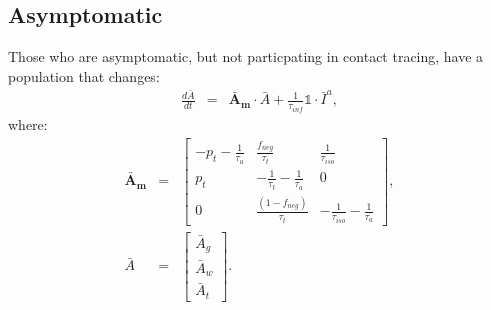\documentclass[notitlepage, superscriptaddress]{revtex4-2}
\begin{document}
\subsection{Asymptomatic}
Those who are asymptomatic, but not particpating in contact tracing, have a population that changes:
\begin{eqnarray}
\frac{d\bar{A}}{dt} &=& \boldsymbol{\bar{A}_{m}} \cdot  \bar{A} + \frac{1}{\tau_{inf}} \mathbb{1} \cdot  \bar{I}^{a}, 
\end{eqnarray}
where:
%
\begin{eqnarray}
\boldsymbol{\bar{A}_{m}} &=&
\begin{bmatrix}
- p_{t} -\frac{1}{\tau_{a}}  &  \frac{f_{neg}}{\tau_{t}}            & \frac{1}{\tau_{iso}} \\ 
 p_{t}              & -\frac{1}{\tau_{t}} -\frac{1}{\tau_{a}}       & 0  \\ 
 0                  & \frac{(1- f_{neg})}{\tau_{t}}                        & -\frac{1}{\tau_{iso}} -\frac{1}{\tau_{a}}
\end{bmatrix}, \\ 
%
\bar{A} &=& 
\begin{bmatrix}
\bar{A}_{g} \\ \bar{A}_{w}\\ \bar{A}_{t}
\end{bmatrix}. \\ 
%
\end{eqnarray}
\end{document}
